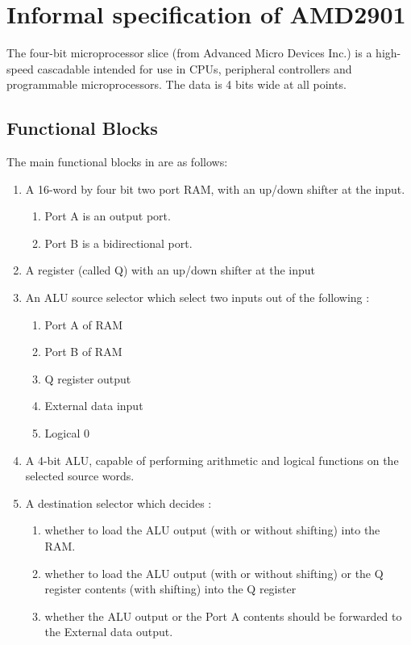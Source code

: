 \section{Informal specification of AMD2901}
\label{AMD2901spec}

The  four-bit microprocessor slice
(from Advanced Micro Devices Inc.)
is a high-speed cascadable  intended for use in CPUs, peripheral 
controllers and programmable microprocessors. 
The data is 4 bits wide at all points.

\subsection*{Functional Blocks}

The main functional blocks in  are as follows:
\begin{enumerate}
\item
A 16-word by four bit two port RAM, with an up/down shifter at the input.
\begin{enumerate}
\item
Port A is an output port.
\item
Port B is a bidirectional port. 
\end{enumerate}
\item
A register (called Q) with an up/down shifter at the input
\item
An ALU source selector which select two inputs out of the following :
\begin{enumerate}
\item
Port A of RAM
\item
Port B of RAM
\item
Q register output
\item
External data input
\item
Logical 0
\end{enumerate}
\item
A 4-bit ALU, capable of performing arithmetic and logical functions on the 
selected source words.
\item
A destination selector which decides :
\begin{enumerate}
\item
whether to load the ALU output (with or without shifting) into the RAM.
\item
whether to load the ALU output (with or without shifting) or the
Q register contents (with shifting) into the Q register
\item
whether the ALU output or the Port A contents should be forwarded to
the External data output.
\end{enumerate}
\end{enumerate}

